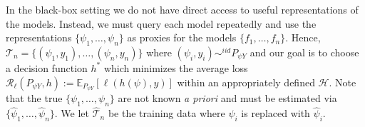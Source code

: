 In the black-box setting we do not have direct access to useful representations of the models. 
Instead, we must query each model repeatedly and use the representations $ \{ \psi_1,\hdots, \psi_n \} $ as proxies for the models $ \{ f_{1}, \hdots, f_{n}\} $. 
Hence, $\mathcal{T}_n=\{ (\psi_1,y_1),\hdots ,(\psi_n,y_n) \}$
where $(\psi_i,y_i) \sim^{iid} P_{\psi Y}$ and our goal is to choose a decision function $h^*$ which minimizes the average loss 
$ \mathcal{R}_{\ell}(P_{\psi Y}, h) := \mathbb{E}_{P_{\psi Y}}\left[\ell(h(\psi), y)\right] $ within an appropriately defined $\mathcal{H}$.
Note that the true $ \{\psi_{1}, \hdots, \psi_{n}\} $ are not known \textit{a priori} and must be estimated via $ \{\widehat{\psi}_{1}, \hdots, \widehat{\psi}_{n}\} $.
We let $ \widehat{\mathcal{T}}_{n} $ be the training data where $ \psi_{i} $ is replaced with $ \widehat{\psi}_{i} $.

